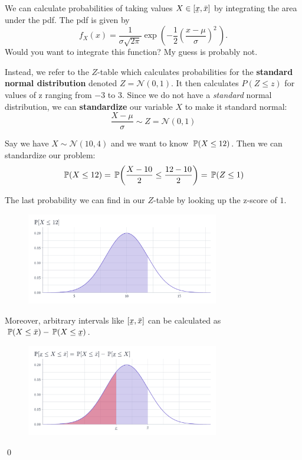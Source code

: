 \documentclass[12pt]{article}
\begin{document}
We can calculate probabilities of taking values $X \in [\ubar{x}, \bar{x}]$ by integrating the area under the pdf. The pdf is given by
$$
  f_X(x) = \frac{1}{\sigma\sqrt{2\pi}} \exp\left( -\frac{1}{2}\left(\frac{x-\mu}{\sigma}\right)^{\!2}\,\right).
$$
Would you want to integrate this function? My guess is probably not. 

Instead, we refer to the $Z$-table which calculates probabilities for the \textbf{standard normal distribution} denoted $Z = \mathcal{N}(0, 1)$. It then calculates $P(Z \leq z)$ for values of z ranging from $-3$ to $3$. Since we do not have a \emph{standard} normal distribution, we can \textbf{standardize} our variable $X$ to make it standard normal:
$$
  \frac{X - \mu}{\sigma} \sim Z = \mathcal{N}(0, 1)
$$

\begin{example}
  Say we have $X \sim \mathcal{N}(10, 4)$ and we want to know $\prob{X \leq 12}$. Then we can standardize our problem:
  $$
    \prob{X \leq 12} = \prob{\frac{X - 10}{2} \leq \frac{12 - 10}{2}} = \prob{Z \leq 1} 
  $$

  The last probability we can find in our $Z$-table by looking up the z-score of $1$. 

  \begin{figure}[h!]
    \begin{center}
      \includegraphics[width=0.75\textwidth]{figures/ex_probability_leq.pdf}
    \end{center}
  \end{figure}

  Moreover, arbitrary intervals like $[\ubar{x}, \bar{x}]$ can be calculated as $\prob{X \leq \bar{x}} - \prob{X \leq \ubar{x}}$.

  \begin{figure}[h!]
    \begin{center}
      \includegraphics[width=0.75\textwidth]{figures/ex_probability_between.pdf}
    \end{center}
  \end{figure}
  
  \qed
\end{example}
\end{document}
